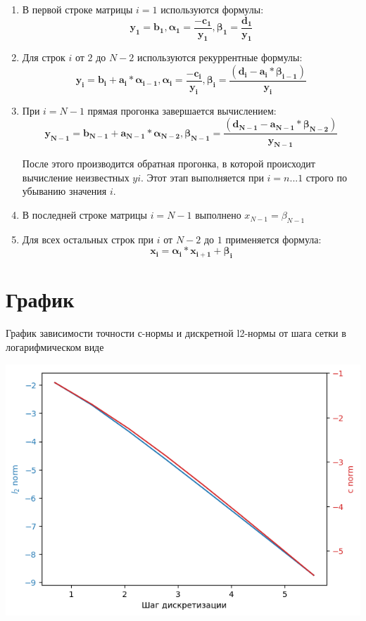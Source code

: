 \documentclass[a4paper,12pt]{report}
\begin{document}
    \begin{enumerate}
        \item В первой строке матрицы $i = 1$ используются формулы:
    \[\mathbf{y_1=b_1, \alpha_1=\frac{-c_1}{y_1}, \beta_1=\frac{d_1}{y_1}}\]
        \item Для строк $i$ от $2$ до $N-2$ используются рекуррентные формулы:
    \[\mathbf{y_i=b_i+a_i*\alpha_{i-1}, \alpha_i=\frac{-c_i}{y_i}, \beta_i=\frac{(d_i-a_i*\beta_{i-1})}{y_i}}\]
        \item При $i = N - 1$ прямая прогонка завершается вычислением: 
    \[\mathbf{y_{N-1}=b_{N-1}+a_{N-1}*\alpha_{N-2}, \beta_{N-1}=\frac{(d_{N-1}-a_{N-1}*\beta_{N-2})}{y_{N-1}}}\]
    
    После этого производится обратная прогонка, в которой происходит вычисление неизвестных $yi$. Этот этап выполняется при $i = n...1$ строго по
    убыванию значения $i$.
        \item В последней строке матрицы $i = N - 1$ выполнено $x_{N-1} = \beta_{N-1}$
    \newline
        \item Для всех остальных строк при $i$ от $N-2$ до $1$ применяется формула:
    \[\mathbf{x_i=\alpha_i*x_{i+1}+\beta_{i}}\]

    \end{enumerate}

    \section*{График}
    
    График зависимости точности с-нормы и дискретной l2-нормы от шага сетки в логарифмическом виде

    
    \includegraphics[width=0.99\linewidth]{graph.png}
    
\end{document}
